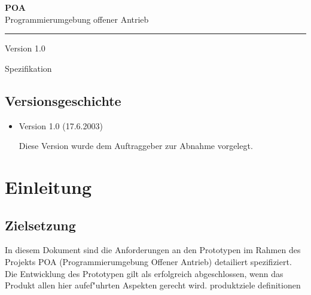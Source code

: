 \documentclass[a4paper,titlepage,12pt,ngerman]{scrbook}
\newcommand\version{Version 1.0 \xspace}
\begin{document}

\begin{titlepage}
\renewcommand{\thefootnote}{\fnsymbol{footnote}}
{\Huge
\raggedright
\textbf{POA} \\
\huge Programmierumgebung offener Antrieb
\rule{\textwidth}{0.75pt}
\par
}
\begin{flushleft}
\normalsize
\version
\end{flushleft}
\vfill

{\parindent=0cm
\Huge Spezifikation
}


\setcounter{footnote}{0}
\end{titlepage}


\section*{Versionsgeschichte}

\begin{itemize}

\item Version 1.0 (17.6.2003)

  Diese Version wurde dem Auftraggeber zur Abnahme vorgelegt.

\end{itemize}


\tableofcontents


\chapter {Einleitung}
\section {Zielsetzung}
In diesem Dokument sind die Anforderungen an den Prototypen im Rahmen des Projekts POA (Programmierumgebung Offener Antrieb) 
detailiert spezifiziert. Die Entwicklung des Prototypen gilt als erfolgreich abgeschlossen, wenn das Produkt allen hier aufef"uhrten Aspekten
gerecht wird.
 {produktziele}
 {definitionen}
\end{document}

